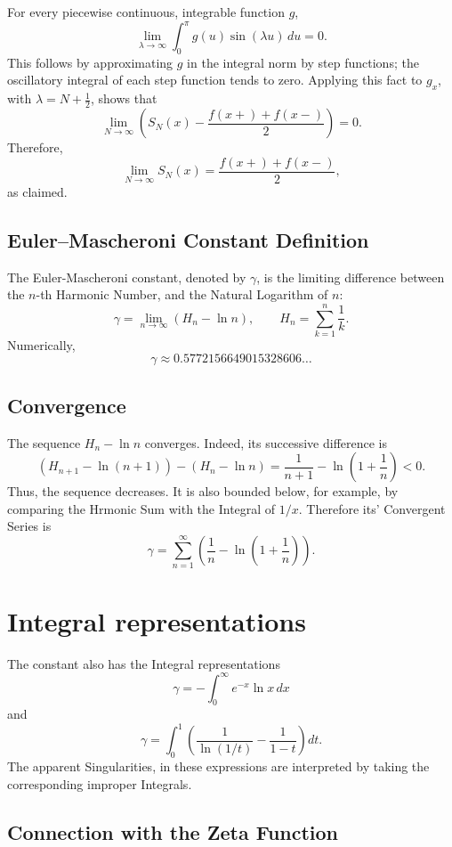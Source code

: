 \documentclass[a4paper, 10pt, onepage]{elegantbook}
\begin{document}
For every piecewise continuous, integrable function \(g\),
\[
\lim_{\lambda\to\infty}\int_0^\pi g(u)\sin(\lambda u)\,du=0.
\]
This follows by approximating \(g\) in the integral norm by step functions; the oscillatory integral of each step function tends to zero. Applying this fact to \(g_x\), with
\(\lambda=N+\tfrac12\), shows that
\[
\lim_{N\to\infty}
\left(S_N(x)-\frac{f(x+)+f(x-)}{2}\right)=0.
\]
Therefore,
\[
\lim_{N\to\infty}S_N(x)
=\frac{f(x+)+f(x-)}{2},
\]
as claimed.



\subsection{Euler--Mascheroni Constant Definition}

The Euler-Mascheroni constant, denoted by \(\gamma\), is the limiting difference between the \(n\)-th Harmonic Number, and the Natural Logarithm of \(n\):
\[
\boxed{
\gamma=\lim_{n\to\infty}\left(H_n-\ln n\right)
},
\qquad
H_n=\sum_{k=1}^{n}\frac{1}{k}.
\]
Numerically,
\[
\gamma\approx 0.5772156649015328606\ldots
\]

\subsection{Convergence}

The sequence \(H_n-\ln n\) converges. Indeed, its successive difference is
\[
(H_{n+1}-\ln(n+1))-(H_n-\ln n)
=
\frac{1}{n+1}-\ln\left(1+\frac{1}{n}\right)<0.
\]
Thus, the sequence decreases. It is also bounded below, for example, by comparing the Hrmonic Sum with the Integral of \(1/x\). Therefore its' Convergent Series is
\[
\gamma
=
\sum_{n=1}^{\infty}
\left(
\frac{1}{n}-\ln\left(1+\frac{1}{n}\right)
\right).
\]

\section{Integral representations}

The constant also has the Integral representations
\[
\gamma
=-\int_0^\infty e^{-x}\ln x\,dx
\]
and
\[
\gamma
=\int_0^1
\left(
\frac{1}{\ln(1/t)}-\frac{1}{1-t}
\right)dt.
\]
The apparent Singularities, in these expressions are interpreted by taking the corresponding improper Integrals.

\subsection{Connection with the Zeta Function}
\end{document}
